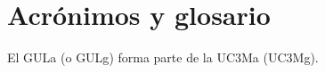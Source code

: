 \section{Acrónimos y glosario}

El \gls{GULa} (o \gls{GULg}) forma parte de la \gls{UC3Ma} (\gls{UC3Mg}).
